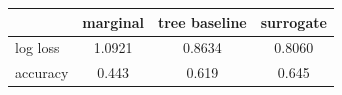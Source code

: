 \begin{tabular}{lccc}
\toprule
 & marginal & tree baseline & surrogate \\
\midrule
log loss & 1.0921 & 0.8634 & 0.8060 \\
accuracy & 0.443 & 0.619 & 0.645 \\
\bottomrule
\end{tabular}
